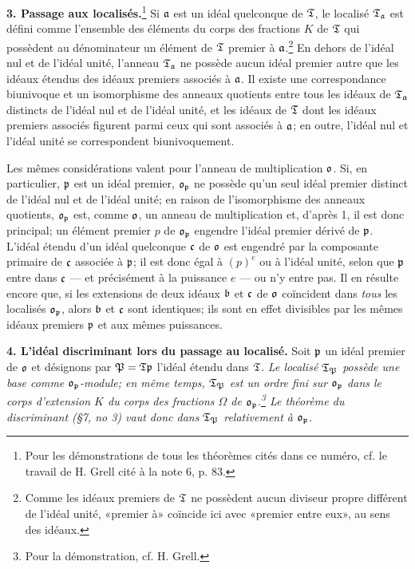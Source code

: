 \textbf{3. Passage aux localisés.}\footnote{Pour les démonstrations de tous les théorèmes cités dans ce numéro, cf. le travail de H. Grell cité à la note 6, p. 83.} Si $\mathfrak a$ est un idéal quelconque de $\mathfrak T$, le localisé $\mathfrak T_\mathfrak a$ est défini comme l'ensemble des éléments du corps des fractions $K$ de $\mathfrak T$ qui possèdent au dénominateur un élément de $\mathfrak T$ premier à $\mathfrak a$.\footnote{Comme les idéaux premiers de $\mathfrak T$ ne possèdent aucun diviseur propre différent de l'idéal unité, «premier à» coïncide ici avec «premier entre eux», au sens des idéaux.} En dehors de l'idéal nul et de l'idéal unité, l'anneau $\mathfrak T_\mathfrak a$ ne possède aucun idéal premier autre que les idéaux étendus des idéaux premiers associés à $\mathfrak a$. Il existe une correspondance biunivoque et un isomorphisme des anneaux quotients entre tous les idéaux de $\mathfrak T_\mathfrak a$ distincts de l'idéal nul et de l'idéal unité, et les idéaux de $\mathfrak T$ dont les idéaux premiers associés figurent parmi ceux qui sont associés à $\mathfrak a$; en outre, l'idéal nul et l'idéal unité se correspondent biunivoquement.

Les mêmes considérations valent pour l'anneau de multiplication $\mathfrak o$. Si, en particulier, $\mathfrak p$ est un idéal premier, $\mathfrak o_\mathfrak p$ ne possède qu'un seul idéal premier distinct de l'idéal nul et de l'idéal unité; en raison de l'isomorphisme des anneaux quotients, $\mathfrak o_\mathfrak p$ est, comme $\mathfrak o$, un anneau de multiplication et, d'après 1, il est donc principal; un élément premier $p$ de $\mathfrak o_\mathfrak p$ engendre l'idéal premier dérivé de $\mathfrak p$. L'idéal étendu d'un idéal quelconque $\mathfrak c$ de $\mathfrak o$ est engendré par la composante primaire de $\mathfrak c$ associée à $\mathfrak p$; il est donc égal à $(p)^e$ ou à l'idéal unité, selon que $\mathfrak p$ entre dans $\mathfrak c$ --- et précisément à la puissance $e$ --- ou n'y entre pas. Il en résulte encore que, si les extensions de deux idéaux $\mathfrak b$ et $\mathfrak c$ de $\mathfrak o$ coïncident dans \emph{tous} les localisés $\mathfrak o_\mathfrak p$, alors $\mathfrak b$ et $\mathfrak c$ sont identiques; ils sont en effet divisibles par les mêmes idéaux premiers $\mathfrak p$ et aux mêmes puissances.

\textbf{4. L'idéal discriminant lors du passage au localisé.} Soit $\mathfrak p$ un idéal premier de $\mathfrak o$ et désignons par $\mathfrak P=\mathfrak T\mathfrak p$ l'idéal étendu dans $\mathfrak T$. \emph{Le localisé $\mathfrak T_\mathfrak P$ possède une base comme $\mathfrak o_\mathfrak p$-module; en même temps, $\mathfrak T_\mathfrak P$ est un ordre fini sur $\mathfrak o_\mathfrak p$ dans le corps d'extension $K$ du corps des fractions $\Omega$ de $\mathfrak o_\mathfrak p$.\footnote{Pour la démonstration, cf. H. Grell.} Le théorème du discriminant (\S 7, no 3) vaut donc dans $\mathfrak T_\mathfrak P$ relativement à $\mathfrak o_\mathfrak p$.}

